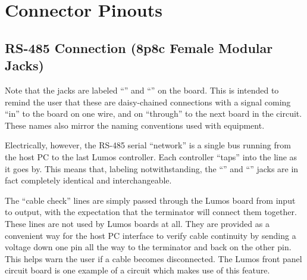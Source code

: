 \chapter{Connector Pinouts}
\section{RS-485 Connection (8p8c Female Modular Jacks)}
\begin{center}
\end{center}
Note that the jacks are labeled ``'' and ``'' on the board.  This is intended to remind the user
that these are daisy-chained connections with a signal coming ``in'' to the board on one wire, and on ``through'' to
the next board in the circuit.%
These
names also mirror the naming conventions used with  equipment. 

Electrically, however, the RS-485 serial ``network'' is a single bus running from the host PC to the last Lumos
controller.  Each controller ``taps'' into the line as it goes by.  This means that, labeling notwithstanding,
the ``'' and ``'' jacks are in fact completely identical and interchangeable.

The ``cable check'' lines are simply passed through the Lumos board from input to output, with the expectation that
the terminator will connect them together.  These lines are not used by Lumos boards at all.  They are provided as
a convenient way for the host PC interface to verify cable continuity by sending a voltage down one pin all
the way to the terminator and back on the other pin.  This helps warn the user if a cable becomes disconnected.
The Lumos front panel circuit board is one example of a circuit which makes use of this feature.

